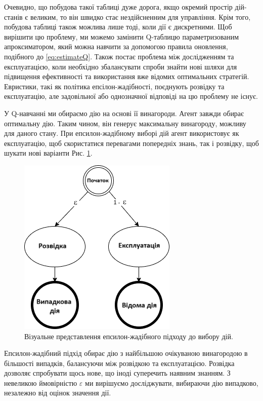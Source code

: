 \par Очевидно, що побудова такої таблиці дуже дорога, якщо окремий простір дій-станів є 
великим, то він швидко стає нездійсненним для управління. 
Крім того, побудова таблиці також можлива лише тоді, коли дії є диск\-рет\-ними. Щоб вирішити цю
 проблему, ми можемо замінити Q-таблицю параметризованим апроксиматором, який можна 
 навчити за допомогою правила оновлення, подібного до \ref{eq:estimateQ}.
 Також постає проблема між дослідженням та експлуатацією, коли необхідно 
 збалансувати спроби знайти нові шляхи для підвищення ефективності та використання 
 вже відомих оптимальних стратегій. Евристики, такі як
  політика епсілон-жадібності, поєднують розвідку та експлуатацію, але задовільної 
  або однозначної відповіді на цю проблему не існує.
\par У Q-навчанні ми обираємо дію на основі її винагороди. 
Агент завжди обирає оптимальну дію. Таким чином, він генерує максимальну винагороду, 
можливу для даного стану.
При епсилон-жадібному виборі дій агент використовує як експлуатацію, 
щоб скористатися перевагами попередніх знань, так і розвідку, щоб шукати нові варіанти Рис. \ref{fig:epsilongreedy}.
\begin{figure}[H]
  \centering
  \includegraphics[scale = 1.25]{Pictures/q-learning-epsilon-greedy-1.png}
  \caption{Візуальне представлення епсилон-жадібного підходу до вибору дій.}
  \label{fig:epsilongreedy}
\end{figure}
Епсилон-жадібний підхід обирає дію з найбільшою очікуваною винагородою в більшості випадків,
 балансуючи між розвідкою та експлуатацією. Розвідка дозволяє спробувати щось нове, що іноді
  суперечить наявним знанням. З невеликою ймовірністю $\varepsilon$ ми вирішуємо 
  досліджувати, вибираючи дію випадково, незалежно від оцінок значення дії.
